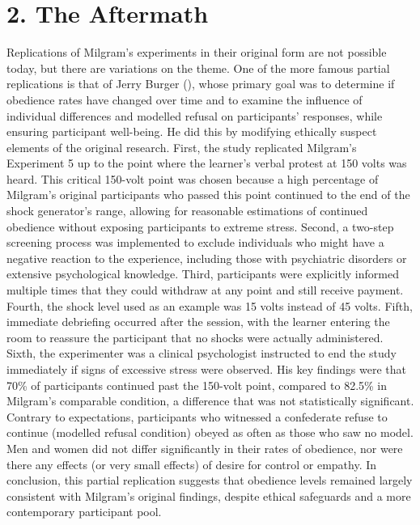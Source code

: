 \documentclass[
  letterpaper,
]{book}
\begin{document}
\section{2. The Aftermath}\label{the-aftermath-7}

Replications of Milgram's experiments in their original form are not
possible today, but there are variations on the theme. One of the more
famous partial replications is that of Jerry Burger
(), whose primary goal was
to determine if obedience rates have changed over time and to examine
the influence of individual differences and modelled refusal on
participants' responses, while ensuring participant well-being. He did
this by modifying ethically suspect elements of the original research.
First, the study replicated Milgram's Experiment 5 up to the point where
the learner's verbal protest at 150 volts was heard. This critical
150-volt point was chosen because a high percentage of Milgram's
original participants who passed this point continued to the end of the
shock generator's range, allowing for reasonable estimations of
continued obedience without exposing participants to extreme stress.
Second, a two-step screening process was implemented to exclude
individuals who might have a negative reaction to the experience,
including those with psychiatric disorders or extensive psychological
knowledge. Third, participants were explicitly informed multiple times
that they could withdraw at any point and still receive payment. Fourth,
the shock level used as an example was 15 volts instead of 45 volts.
Fifth, immediate debriefing occurred after the session, with the learner
entering the room to reassure the participant that no shocks were
actually administered. Sixth, the experimenter was a clinical
psychologist instructed to end the study immediately if signs of
excessive stress were observed. His key findings were that 70\% of
participants continued past the 150-volt point, compared to 82.5\% in
Milgram's comparable condition, a difference that was not statistically
significant. Contrary to expectations, participants who witnessed a
confederate refuse to continue (modelled refusal condition) obeyed as
often as those who saw no model. Men and women did not differ
significantly in their rates of obedience, nor were there any effects
(or very small effects) of desire for control or empathy. In conclusion,
this partial replication suggests that obedience levels remained largely
consistent with Milgram's original findings, despite ethical safeguards
and a more contemporary participant pool.
\end{document}
